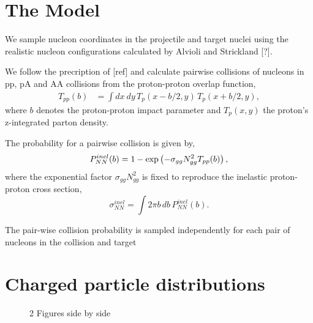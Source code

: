 \documentclass[aps,prl,reprint,amsmath,nofootinbib]{revtex4-1}
\begin{document}
\section{The Model}
We sample nucleon coordinates in the projectile and target nuclei using the realistic nucleon configurations calculated by Alvioli 
and Strickland [?].

We follow the precription of [ref] and calculate pairwise collisions of nucleons in pp, pA and AA collisions from the proton-proton 
overlap function,
\begin{align}
 T_{pp}(b) &= \int dx~dy \,T_p(x-b/2,y) \,T_p(x+b/2,y),
\end{align}
where $b$ denotes the proton-proton impact parameter and $T_p(x,y)$ the proton's z-integrated parton density.

The probability for a pairwise collision is given by,
\begin{equation}
  P^{inel}_{NN}(b) = 1 - \exp \left(-\sigma_{gg} N_{gg}^2 T_{pp}(b) \right), \\[1ex]
\end{equation}
where the exponential factor $\sigma_{gg} N_{gg}^2$ is fixed to reproduce the inelastic proton-proton cross section,
\begin{equation}
  \sigma^{inel}_{NN} = \int 2 \pi b \,db \, P_{NN}^{inel}(b).
\end{equation}

The pair-wise collision probability is sampled independently for each pair of nucleons in the collision and target

\section{Charged particle distributions}

\begin{figure*}
    \centering
    \caption{2 Figures side by side}
    \label{fig:example}
\end{figure*}


\end{document}

